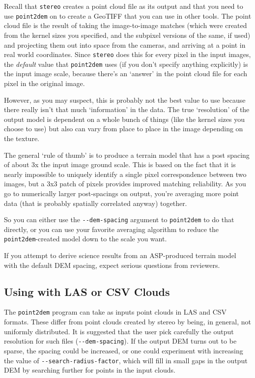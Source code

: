 Recall that \texttt{stereo} creates a point cloud file as its output
and that you need to use \texttt{point2dem} on to create a GeoTIFF that
you can use in other tools.  The point cloud file is the result of
taking the image-to-image matches (which were created from the
kernel sizes you specified, and the subpixel versions of the same,
if used) and projecting them out into space from the cameras, and
arriving at a point in real world coordinates.  Since \texttt{stereo} does
this for every pixel in the input images, the \emph{default} value that
\texttt{point2dem} uses (if you don't specify anything explicitly) is the
input image scale, because there's an `answer' in the point cloud
file for each pixel in the original image.

However, as you may suspect, this is probably not the best value to
use because there really isn't that much `information' in the data.
The true `resolution' of the output model is dependent on a whole
bunch of things (like the kernel sizes you choose to use) but also can
vary from place to place in the image depending on the texture.

The general `rule of thumb' is to produce a terrain model that has a
post spacing of about 3x the input image ground scale.  This is based
on the fact that it is nearly impossible to uniquely identify a single
pixel correspondence between two images, but a 3x3 patch of pixels
provides improved matching reliability.  As you go to numerically
larger post-spacings on output, you're averaging more point data (that
is probably spatially correlated anyway) together.

So you can either use the \texttt{-\/-dem-spacing} argument to
\texttt{point2dem} to do that directly, or you can use your
favorite averaging algorithm to reduce the \texttt{point2dem}-created
model down to the scale you want.

If you attempt to derive science results from an ASP-produced terrain model
with the default \ac{DEM} spacing, expect serious questions from reviewers.

\subsection{Using with LAS or CSV Clouds}

The \texttt{point2dem} program can take as inputs point clouds in LAS
and CSV formats. These differ from point clouds created by stereo by
being, in general, not uniformly distributed.  It is suggested that the
user pick carefully the output resolution for such files
(\texttt{-\/-dem-spacing}). If the output \ac{DEM} turns out to be sparse,
the spacing could be increased, or one could experiment with increasing
the value of \texttt{-\/-search-radius-factor}, which will fill in small
gaps in the output \ac{DEM} by searching further for points in the input
clouds.

